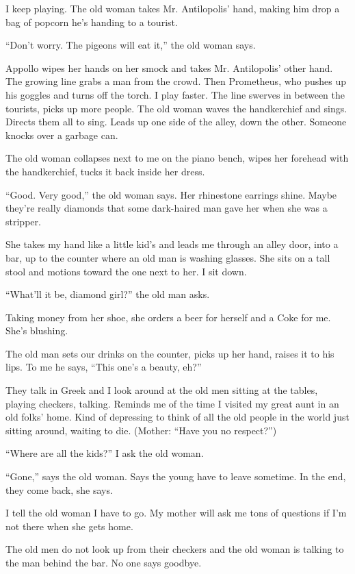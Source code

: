 \documentclass[
]{article}
\begin{document}
I keep playing. The old woman takes Mr. Antilopolis' hand, making him
drop a bag of pop­corn he's handing to a tourist.

``Don't worry. The pigeons will eat it,'' the old woman says.

Appollo wipes her hands on her smock and takes Mr. Antilopolis' other
hand. The growing line grabs a man from the crowd. Then Prometheus, who
pushes up his goggles and turns off the torch. I play faster. The line
swerves in between the tourists, picks up more people. The old woman
waves the handkerchief and sings. Directs them all to sing. Leads up one
side of the alley, down the other. Someone knocks over a garbage can.

The old woman collapses next to me on the piano bench, wipes her
forehead with the hand­kerchief, tucks it back inside her dress.

``Good. Very good,'' the old woman says. Her rhinestone earrings shine.
Maybe they're really diamonds that some dark-haired man gave her when
she was a stripper.

She takes my hand like a little kid's and leads me through an alley
door, into a bar, up to the counter where an old man is washing glasses.
She sits on a tall stool and motions toward the one next to her. I sit
down.

``What'll it be, diamond girl?'' the old man asks.

Taking money from her shoe, she orders a beer for herself and a Coke for
me. She's blushing.

The old man sets our drinks on the counter, picks up her hand, raises it
to his lips. To me he says, ``This one's a beauty, eh?''

They talk in Greek and I look around at the old men sitting at the
tables, playing checkers, talking. Reminds me of the time I visited my
great aunt in an old folks' home. Kind of depressing to think of all the
old people in the world just sitting around, waiting to die. (Mother:
``Have you no respect?'')

``Where are all the kids?'' I ask the old woman.

``Gone,'' says the old woman. Says the young have to leave sometime. In
the end, they come back, she says.

I tell the old woman I have to go. My mother will ask me tons of
questions if I'm not there when she gets home.

The old men do not look up from their checkers and the old woman is
talking to the man behind the bar. No one says goodbye.
\end{document}
